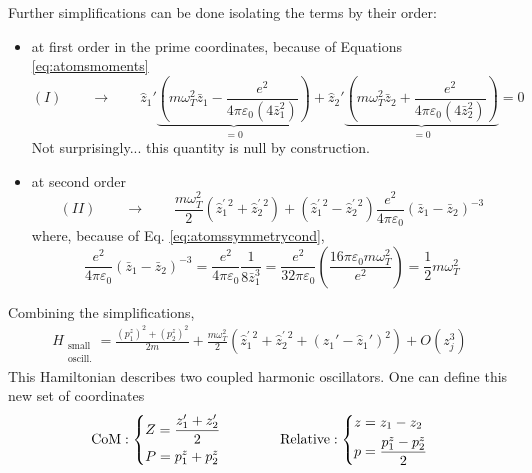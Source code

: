 Further simplifications can be done isolating the terms by their order:
\begin{itemize}
    \item at first order in the prime coordinates, because of Equations \ref{eq:atomsmoments}
    \begin{equation*}
    (I) \qquad \longrightarrow \qquad
        \hat{z}_1' \underbrace{
            \left(
                m\omega_T^2\bar{z}_1 - \frac{e^2}{4\pi\varepsilon_0(4\bar{z}_1^2)} 
            \right)
        }_{=0} + \hat{z}_2' \underbrace{
            \left(
                m\omega_T^2\bar{z}_2 + \frac{e^2}{4\pi\varepsilon_0(4\bar{z}_2^2)} 
            \right)
        }_{=0} = 0
    \end{equation*}
    Not surprisingly... this quantity is null by construction.
    
    \item at second order
    \begin{equation*}
    (II) \qquad \longrightarrow \qquad
    \frac{m\omega_T^2}{2}
    \left( \hat{z}_1^{\prime\;2} + \hat{z}_2^{\prime\;2}  \right)
    +
    \left( \hat{z}_1^{\prime\;2} - \hat{z}_2^{\prime\;2} \right)
    {\frac{e^2}{4\pi\varepsilon_0}(\bar{z}_1-\bar{z}_2)^{-3}}
    \end{equation*}
    where, because of Eq. \ref{eq:atomssymmetrycond},
    \begin{equation*}
    \frac{e^2}{4\pi\varepsilon_0}(\bar{z}_1-\bar{z}_2)^{-3} =
    \frac{e^2}{4\pi\varepsilon_0}\frac{1}{8\bar{z}_1^3} =
    \frac{e^2}{32\pi\varepsilon_0}
    \left(
        \frac{16\pi\varepsilon_0m\omega^2_T}{e^2}
    \right) = \frac{1}{2}m\omega_T^2
    \end{equation*}
\end{itemize}
Combining the simplifications,
\begin{align}
\label{eq:atoms-harmonic-coupled}
H_{\substack{\text{small} \\ \text{oscill.}}} = 
\frac{(p_1^z)^2+(p_2^z)^2}{2m}
+
 \frac{m\omega_T^2}{2}
    \left(
        \hat{z}_1^{\prime\;2} + \hat{z}_2^{\prime\;2}
        + \left( \hat{z}_1'-\hat{z}_1' \right)^2
    \right)
    + {O}\left( z_j^3 \right)
\end{align}
This Hamiltonian describes two coupled harmonic oscillators. One can define this new set of coordinates
\begin{equation}
\text{CoM}: \begin{dcases}
Z=\frac{z_1'+z_2'}{2}\\P=p_1^z+p_2^z
\end{dcases}
\qquad \qquad 
\text{Relative}: \begin{dcases}
z=z_1-z_2\\p = \frac{p^z_1-p^z_2}{2}
\end{dcases}
\end{equation}
